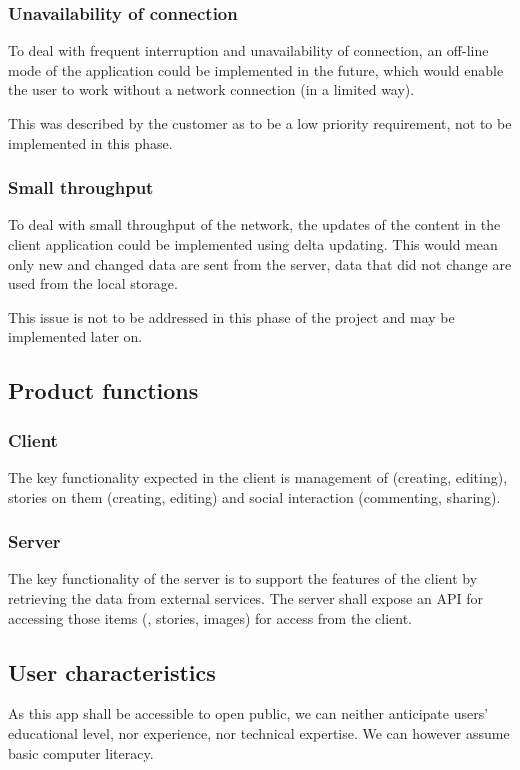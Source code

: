 \documentclass[11pt]{book}
\begin{document}
\subsubsection{Unavailability of connection}\label{sec:req_unavailability_of_connection}
To deal with frequent interruption and unavailability of connection, an off-line mode of the application could be implemented in the future, which would enable the user to work without a network connection (in a limited way).

This was described by the customer as to be a low priority requirement, not to be implemented in this phase.

\subsubsection{Small throughput}
To deal with small throughput of the network, the updates of the content in the client application could be implemented using delta updating. This would mean only new and changed data are sent from the server, data that did not change are used from the local storage.

This issue is not to be addressed in this phase of the project and may be implemented later on.

\subsection{Product functions}

\subsubsection{Client}
The key functionality expected in the client is management of \wallentityp (creating, editing), stories on them (creating, editing) and social interaction (commenting, sharing).

\subsubsection{Server}
The key functionality of the server is to support the features of the client by retrieving the data from external services. The server shall expose an API for accessing those items (\wallentityp, stories, images) for access from the client.

\subsection{User characteristics} \label{sec:req_user_characteristics}
As this app shall be accessible to open public, we can neither anticipate users' educational level, nor experience, nor technical expertise. We can however assume basic computer literacy.
\end{document}
